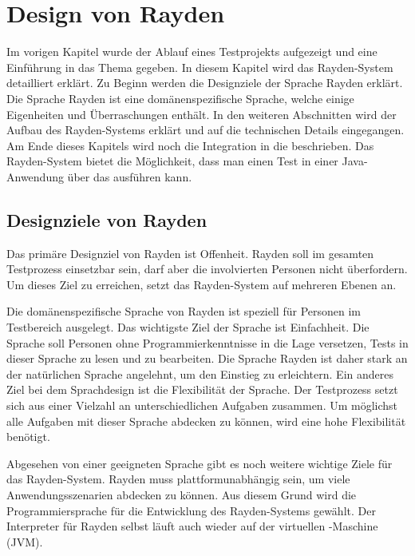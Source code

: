 \chapter{Design von Rayden}
\label{cha:Design}

Im vorigen Kapitel wurde der Ablauf eines Testprojekts aufgezeigt und eine Einführung in das Thema  gegeben. In diesem Kapitel wird das Rayden-System detailliert erklärt. Zu Beginn werden die Designziele der Sprache Rayden erklärt. Die Sprache Rayden ist eine domänenspezifische Sprache, welche einige Eigenheiten und Überraschungen enthält. In den weiteren Abschnitten wird der Aufbau des Rayden-Systems erklärt und auf die technischen Details eingegangen. Am Ende dieses Kapitels wird noch die Integration in die  \cite{JavaScriptApi} beschrieben. Das Rayden-System bietet die Möglichkeit, dass man einen Test in einer Java-Anwendung über das  ausführen kann.


\section{Designziele von Rayden}

Das primäre Designziel von Rayden ist Offenheit. Rayden soll im gesamten Testprozess einsetzbar sein, darf aber die involvierten Personen nicht überfordern. Um dieses Ziel zu erreichen, setzt das Rayden-System auf mehreren Ebenen an.

\SuperPar
Die domänenspezifische Sprache von Rayden ist speziell für Personen im Testbereich ausgelegt. Das wichtigste Ziel der Sprache ist Einfachheit. Die Sprache soll Personen ohne Programmierkenntnisse in die Lage versetzen, Tests in dieser Sprache zu lesen und zu bearbeiten. Die Sprache Rayden ist daher stark an der natürlichen Sprache angelehnt, um den Einstieg zu erleichtern. Ein anderes Ziel bei dem Sprachdesign ist die Flexibilität der Sprache. Der Testprozess setzt sich aus einer Vielzahl an unterschiedlichen Aufgaben zusammen. Um möglichst alle Aufgaben mit dieser Sprache abdecken zu können, wird eine hohe Flexibilität benötigt. 

\SuperPar
Abgesehen von einer geeigneten Sprache gibt es noch weitere wichtige Ziele für das Rayden-System. Rayden muss plattformunabhängig sein, um viele Anwendungsszenarien abdecken zu können. Aus diesem Grund wird die Programmiersprache  für die Entwicklung des Rayden-Systems gewählt. Der Interpreter für Rayden selbst läuft auch wieder auf der virtuellen -Maschine (JVM).

